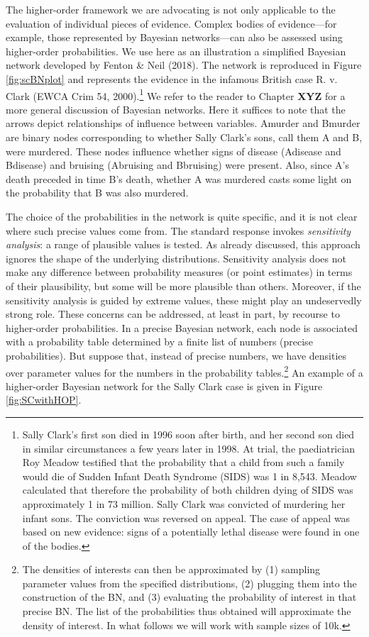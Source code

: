 \documentclass[
  10pt,
  dvipsnames,enabledeprecatedfontcommands]{scrartcl}
\begin{document}
The higher-order framework we are advocating is not only applicable to
the evaluation of individual pieces of evidence. Complex bodies of
evidence---for example, those represented by Bayesian networks---can
also be assessed using higher-order probabilities. We use here as an
illustration a simplified Bayesian network developed by Fenton \& Neil
(2018). The network is reproduced in Figure \ref{fig:scBNplot} and
represents the evidence in the infamous British case R. v. Clark (EWCA
Crim 54, 2000).\footnote{ Sally Clark's first son died in 1996 soon
  after birth, and her second son died in similar circumstances a few
  years later in 1998. At trial, the paediatrician Roy Meadow testified
  that the probability that a child from such a family would die of
  Sudden Infant Death Syndrome (SIDS) was 1 in 8,543. Meadow calculated
  that therefore the probability of both children dying of SIDS was
  approximately 1 in 73 million. Sally Clark was convicted of murdering
  her infant sons. The conviction was reversed on appeal. The case of
  appeal was based on new evidence: signs of a potentially lethal
  disease were found in one of the bodies.} We refer to the reader to
Chapter \textbf{XYZ} for a more general discussion of Bayesian networks.
Here it suffices to note that the arrows depict relationships of
influence between variables. \textsf{Amurder} and \textsf{Bmurder} are
binary nodes corresponding to whether Sally Clark's sons, call them A
and B, were murdered. These nodes influence whether signs of disease
(\textsf{Adisease} and \textsf{Bdisease}) and bruising
(\textsf{Abruising} and \textsf{Bbruising}) were present. Also, since
A's death preceded in time B's death, whether A was murdered casts some
light on the probability that B was also murdered.

The choice of the probabilities in the network is quite specific, and it
is not clear where such precise values come from. The standard response
invokes \emph{sensitivity analysis}: a range of plausible values is
tested. As already discussed, this approach ignores the shape of the
underlying distributions. Sensitivity analysis does not make any
difference between probability measures (or point estimates) in terms of
their plausibility, but some will be more plausible than others.
Moreover, if the sensitivity analysis is guided by extreme values, these
might play an undeservedly strong role. These concerns can be addressed,
at least in part, by recourse to higher-order probabilities. In a
precise Bayesian network, each node is associated with a probability
table determined by a finite list of numbers (precise probabilities).
But suppose that, instead of precise numbers, we have densities over
parameter values for the numbers in the probability tables.\footnote{The
  densities of interests can then be approximated by (1) sampling
  parameter values from the specified distributions, (2) plugging them
  into the construction of the BN, and (3) evaluating the probability of
  interest in that precise BN. The list of the probabilities thus
  obtained will approximate the density of interest. In what follows we
  will work with sample sizes of 10k.} An example of a higher-order
Bayesian network for the Sally Clark case is given in Figure
\ref{fig:SCwithHOP}.
\end{document}

